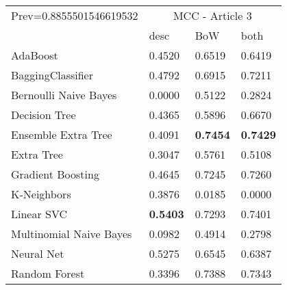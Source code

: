 \begin{tabular}{|l|l|l|l| }
\hline
Prev=0.8855501546619532 &  \multicolumn{3}{c|}{MCC - Article 3} \\
\cline{2-4} & desc & BoW & both \\ \hline
AdaBoost                & 0.4520 & 0.6519 & 0.6419\\
BaggingClassifier       & 0.4792 & 0.6915 & 0.7211\\
Bernoulli Naive Bayes   & 0.0000 & 0.5122 & 0.2824\\
Decision Tree           & 0.4365 & 0.5896 & 0.6670\\
Ensemble Extra Tree     & 0.4091 & {\bf 0.7454} & {\bf 0.7429}\\
Extra Tree              & 0.3047 & 0.5761 & 0.5108\\
Gradient Boosting       & 0.4645 & 0.7245 & 0.7260\\
K-Neighbors             & 0.3876 & 0.0185 & 0.0000\\
Linear SVC              & {\bf 0.5403} & 0.7293 & 0.7401\\
Multinomial Naive Bayes & 0.0982 & 0.4914 & 0.2798\\
Neural Net              & 0.5275 & 0.6545 & 0.6387\\
Random Forest           & 0.3396 & 0.7388 & 0.7343\\
\hline
\end{tabular}